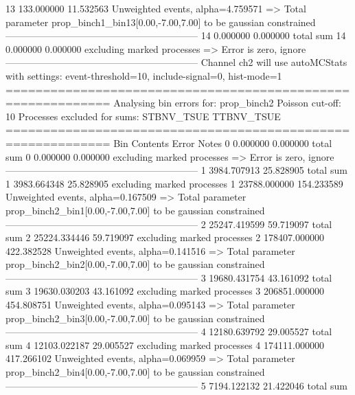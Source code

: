 13         133.000000      11.532563       Unweighted events, alpha=4.759571
  => Total parameter prop_binch1_bin13[0.00,-7.00,7.00] to be gaussian constrained
------------------------------------------------------------
14         0.000000        0.000000        total sum                     
14         0.000000        0.000000        excluding marked processes    
  => Error is zero, ignore      
------------------------------------------------------------
Channel ch2 will use autoMCStats with settings: event-threshold=10, include-signal=0, hist-mode=1
============================================================
Analysing bin errors for: prop_binch2
Poisson cut-off: 10
Processes excluded for sums: STBNV_TSUE TTBNV_TSUE
============================================================
Bin        Contents        Error           Notes                         
0          0.000000        0.000000        total sum                     
0          0.000000        0.000000        excluding marked processes    
  => Error is zero, ignore      
------------------------------------------------------------
1          3984.707913     25.828905       total sum                     
1          3983.664348     25.828905       excluding marked processes    
1          23788.000000    154.233589      Unweighted events, alpha=0.167509
  => Total parameter prop_binch2_bin1[0.00,-7.00,7.00] to be gaussian constrained
------------------------------------------------------------
2          25247.419599    59.719097       total sum                     
2          25224.334446    59.719097       excluding marked processes    
2          178407.000000   422.382528      Unweighted events, alpha=0.141516
  => Total parameter prop_binch2_bin2[0.00,-7.00,7.00] to be gaussian constrained
------------------------------------------------------------
3          19680.431754    43.161092       total sum                     
3          19630.030203    43.161092       excluding marked processes    
3          206851.000000   454.808751      Unweighted events, alpha=0.095143
  => Total parameter prop_binch2_bin3[0.00,-7.00,7.00] to be gaussian constrained
------------------------------------------------------------
4          12180.639792    29.005527       total sum                     
4          12103.022187    29.005527       excluding marked processes    
4          174111.000000   417.266102      Unweighted events, alpha=0.069959
  => Total parameter prop_binch2_bin4[0.00,-7.00,7.00] to be gaussian constrained
------------------------------------------------------------
5          7194.122132     21.422046       total sum                     
